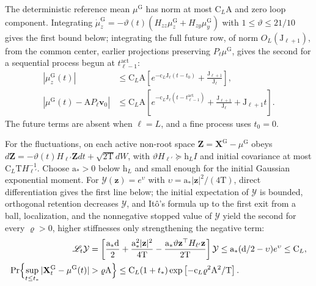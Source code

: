 The deterministic reference mean \(\mu^{\mathrm G}\) has norm at most
\(\mathrm C_L\mathrm A\) and zero loop component. Integrating
\(\dot\mu_z^{\mathrm G}=-\vartheta(t)(H_{zz}\mu_z^{\mathrm G}+H_{zy}\mu_y^{\mathrm G})\)
with \(1\le\vartheta\le21/10\) gives the first bound below; integrating the
full future row, of norm \(O_L(\mathrm J_{\ell+1})\), from the common center,
earlier projections preserving \(P_\ell\mu^{\mathrm G}\), gives the second for
a sequential process begun at \(t^{\mathrm{act}}_{\ell-1}\):
\begin{align}
 |\mu_z^{\mathrm G}(t)|
 &\le \mathrm C_L\mathrm A\left[e^{-\mathrm c_L\mathrm J_\ell(t-t_0)}+\frac{\mathrm J_{\ell+1}}{\mathrm J_\ell}\right],
 \label{eq:rg-formation-current-mean}\\
 |\mu^{\mathrm G}(t)-\mathrm AP_\ell\mathbf v_0|
 &\le \mathrm C_L\mathrm A\left[
 e^{-\mathrm c_L\mathrm J_\ell(t-t^{\mathrm{act}}_{\ell-1})}
 +\frac{\mathrm J_{\ell+1}}{\mathrm J_\ell}+\mathrm J_{\ell+1}t\right].
 \label{eq:rg-formation-window-mean}
\end{align}
The future terms are absent when \(\ell=L\), and a fine process uses \(t_0=0\).

For the fluctuations, on each active non-root space
\(\mathbf Z=\mathbf X^{\mathrm G}-\mu^{\mathrm G}\) obeys
\(d\mathbf Z=-\vartheta(t)H_{\ell'}\mathbf Zdt+\sqrt{2\mathrm T} dW\), with
\(\vartheta H_{\ell'}\succeq\mathrm h_LI\) and initial covariance at most
\(\mathrm C_L\mathrm TH_{\ell'}^{-1}\). Choose \(\mathrm a_*>0\) below
\(\mathrm h_L\) and small enough for the initial Gaussian exponential moment.
For \(\mathcal Y(\mathbf z)=e^{\upsilon}\) with
\(\upsilon=\mathrm a_*|\mathbf z|^2/(4\mathrm T)\), direct differentiation gives
the first line below; the initial expectation of \(\mathcal Y\) is bounded,
orthogonal retention decreases \(\mathcal Y\), and It\^o's formula up to the
first exit from a ball, localization, and the nonnegative stopped value of
\(\mathcal Y\) yield the second for every \(\varrho>0\), higher stiffnesses only
strengthening the negative term:
\begin{align}
 \mathscr L_t\mathcal Y
 &=\left[\frac{\mathrm a_*\mathrm d}{2}
 +\frac{\mathrm a_*^2|\mathbf z|^2}{4\mathrm T}
 -\frac{\mathrm a_*\vartheta\mathbf z^\top H_{\ell'}\mathbf z}{2\mathrm T}\right]\mathcal Y
 \le \mathrm a_*(\mathrm d/2-\upsilon)e^\upsilon\le \mathrm C_L,
 \label{eq:rg-formation-gaussian-exponential-generator}\\
 \Pr\Bigl\{\sup_{t\le t_*}|\mathbf X^{\mathrm G}_t-\mu^{\mathrm G}(t)|&>\varrho\mathrm A\Bigr\}
 \le \mathrm C_L(1+t_*)
       \exp\left[-\mathrm c_L\varrho^2\mathrm A^2/\mathrm T\right].
 \label{eq:rg-formation-gaussian-maximum}
\end{align}

